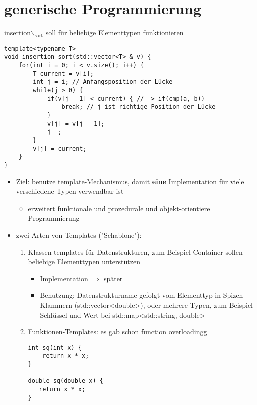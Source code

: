 \documentclass[a4paper]{scrartcl}
\begin{document}
\section{generische Programmierung}
\label{sec-16}
insertion$\backslash$$_{\text{sort}}$ soll für beliebige Elementtypen funktionieren
\begin{verbatim}
template<typename T>
void insertion_sort(std::vector<T> & v) {
	for(int i = 0; i < v.size(); i++) {
		T current = v[i];
		int j = i; // Anfangsposition der Lücke
		while(j > 0) {
			if(v[j - 1] < current) { // -> if(cmp(a, b))
				break; // j ist richtige Position der Lücke
			}
			v[j] = v[j - 1];
			j--;
		}
		v[j] = current;
	}
}
\end{verbatim}
\begin{itemize}
\item Ziel: benutze template-Mechanismus, damit \textbf{eine} Implementation für viele verschiedene Typen verwendbar ist
\begin{itemize}
\item erweitert funktionale und prozedurale und objekt-orientiere Programmierung
\end{itemize}
\item zwei Arten von Templates ("Schablone"):
\begin{enumerate}
\item Klassen-templates für Datenstrukturen, zum Beispiel Container sollen beliebige Elementtypen unterstützen
\begin{itemize}
\item Implementation $\Rightarrow$ später
\item Benutzung: Datenstrukturname gefolgt vom Elementtyp in Spizen Klammern (std::vector<double>), oder mehrere Typen, zum Beispiel Schlüssel und Wert bei std::map<std::string, double>
\end{itemize}
\item Funktionen-Templates: es gab schon function overloadingg
\begin{verbatim}
int sq(int x) {
	return x * x;
}

double sq(double x) {
   return x * x;
}


\end{verbatim}
\end{enumerate}
\end{itemize}$$
\end{document}

